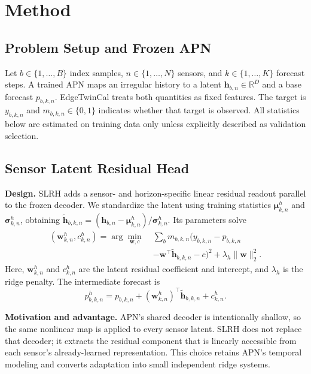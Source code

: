 \documentclass[conference]{IEEEtran}
\begin{document}
\section{Method}
\subsection{Problem Setup and Frozen APN}
Let $b\in\{1,\ldots,B\}$ index samples, $n\in\{1,\ldots,N\}$ sensors, and $k\in\{1,\ldots,K\}$ forecast steps. A trained APN maps an irregular history to a latent $\mathbf{h}_{b,n}\in\mathbb{R}^{D}$ and a base forecast $p_{b,k,n}$. EdgeTwinCal treats both quantities as fixed features. The target is $y_{b,k,n}$ and $m_{b,k,n}\in\{0,1\}$ indicates whether that target is observed. All statistics below are estimated on training data only unless explicitly described as validation selection.

\subsection{Sensor Latent Residual Head}
\textbf{Design.} SLRH adds a sensor- and horizon-specific linear residual readout parallel to the frozen decoder. We standardize the latent using training statistics $\boldsymbol{\mu}^{h}_{k,n}$ and $\boldsymbol{\sigma}^{h}_{k,n}$, obtaining $\tilde{\mathbf{h}}_{b,k,n}=(\mathbf{h}_{b,n}-\boldsymbol{\mu}^{h}_{k,n})/\boldsymbol{\sigma}^{h}_{k,n}$. Its parameters solve
\begin{equation}
\begin{split}
(\mathbf{w}^{h}_{k,n},c^{h}_{k,n})=\arg\min_{\mathbf{w},c}\;&
\sum_b m_{b,k,n}\big(y_{b,k,n}-p_{b,k,n}\\
&-\mathbf{w}^{\top}\tilde{\mathbf{h}}_{b,k,n}-c\big)^2
+\lambda_h\lVert\mathbf{w}\rVert_2^2 .
\end{split}
\label{eq:slrh}
\end{equation}
Here, $\mathbf{w}^{h}_{k,n}$ and $c^{h}_{k,n}$ are the latent residual coefficient and intercept, and $\lambda_h$ is the ridge penalty. The intermediate forecast is
\begin{equation}
p^{h}_{b,k,n}=p_{b,k,n}+(\mathbf{w}^{h}_{k,n})^{\top}\tilde{\mathbf{h}}_{b,k,n}+c^{h}_{k,n}.
\label{eq:latentpred}
\end{equation}

\textbf{Motivation and advantage.} APN's shared decoder is intentionally shallow, so the same nonlinear map is applied to every sensor latent. SLRH does not replace that decoder; it extracts the residual component that is linearly accessible from each sensor's already-learned representation. This choice retains APN's temporal modeling and converts adaptation into small independent ridge systems.
\end{document}
